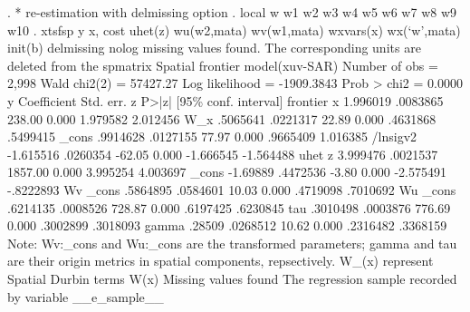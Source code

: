 . * re-estimation with delmissing option 
. local w w1 w2 w3 w4 w5 w6 w7 w8 w9 w10
{\smallskip}
. xtsfsp y x, cost uhet(z) wu(w2,mata) wv(w1,mata) wxvars(x) wx(`w',mata) init(b) delmissing nolog
missing values found. The corresponding units are deleted from the spmatrix
{\smallskip}
Spatial frontier model(xuv-SAR)                       Number of obs =    2,998
                                                      Wald chi2(2)  = 57427.27
Log likelihood = -1909.3843                           Prob > chi2   =   0.0000
{\smallskip}
           y {\VBAR} Coefficient  Std. err.      z    P>|z|     [95\% conf. interval]
frontier     {\VBAR}
           x {\VBAR}   1.996019   .0083865   238.00   0.000     1.979582    2.012456
         W_x {\VBAR}   .5065641   .0221317    22.89   0.000     .4631868    .5499415
       _cons {\VBAR}   .9914628   .0127155    77.97   0.000     .9665409    1.016385
    /lnsigv2 {\VBAR}  -1.615516   .0260354   -62.05   0.000    -1.666545   -1.564488
uhet         {\VBAR}
           z {\VBAR}   3.999476   .0021537  1857.00   0.000     3.995254    4.003697
       _cons {\VBAR}   -1.69889   .4472536    -3.80   0.000    -2.575491   -.8222893
Wv           {\VBAR}
       _cons {\VBAR}   .5864895   .0584601    10.03   0.000     .4719098    .7010692
Wu           {\VBAR}
       _cons {\VBAR}   .6214135   .0008526   728.87   0.000     .6197425    .6230845
         tau {\VBAR}   .3010498   .0003876   776.69   0.000     .3002899    .3018093
       gamma {\VBAR}     .28509   .0268512    10.62   0.000     .2316482    .3368159
Note: Wv:_cons and Wu:_cons are the transformed parameters;
      gamma and tau are their origin metrics in spatial components, repsectively.
      W_(x) represent Spatial Durbin terms W(x)
      Missing values found
      The regression sample recorded by variable __e_sample__
